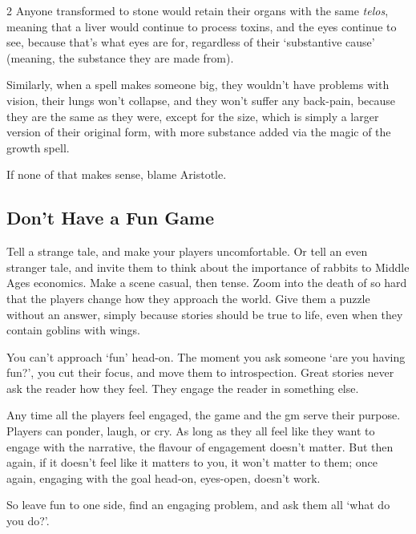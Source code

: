 \begin{multicols}{2}
Anyone transformed to stone would retain their organs with the same \textit{telos}, meaning that a liver would continue to process toxins, and the eyes continue to see, because that's what eyes are for, regardless of their `substantive cause' (meaning, the substance they are made from).

Similarly, when a spell makes someone big, they wouldn't have problems with vision, their lungs won't collapse, and they won't suffer any back-pain, because they are the same as they were, except for the size, which is simply a larger version of their original form, with more substance added via the magic of the growth spell.

If none of that makes sense, blame Aristotle.

\subsection{Don't Have a Fun Game}

Tell a strange tale, and make your players uncomfortable.
Or tell an even stranger tale, and invite them to think about the importance of rabbits to Middle Ages economics.
Make a scene casual, then tense.
Zoom into the death of  so hard that the players change how they approach the world.
Give them a puzzle without an answer, simply because stories should be true to life, even when they contain goblins with wings.

You can't approach `fun' head-on.
The moment you ask someone `are you having fun?', you cut their focus, and move them to introspection.
Great stories never ask the reader how they feel.
They engage the reader in something else.

Any time all the players feel engaged, the game and the \gls{gm} serve their purpose.
Players can ponder, laugh, or cry.
As long as they all feel like they want to engage with the narrative, the flavour of engagement doesn't matter.
But then again, if it doesn't feel like it matters to you, it won't matter to them; once again, engaging with the goal head-on, eyes-open, doesn't work.

So leave fun to one side, find an engaging problem, and ask them all `what do you do?'.

\end{multicols}
